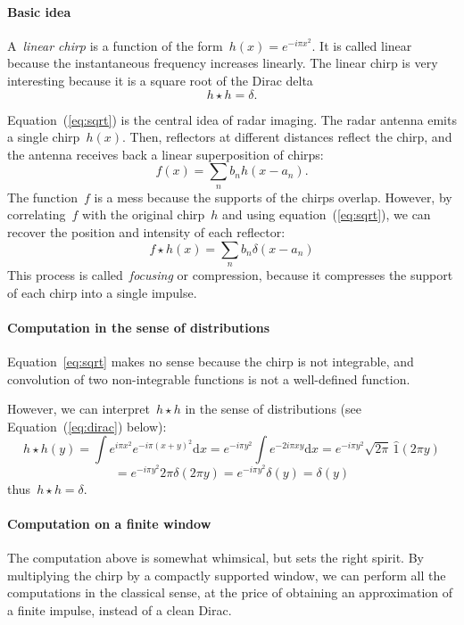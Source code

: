 \documentclass[a4paper]{article}      %
\newcommand{\1}{\mathbf{1}}
\newcommand{\ud}{\mathrm{d}}
\newcommand{\paren}[1]{\left(#1\right)}
\begin{document}
\paragraph{Basic idea}
A~\emph{linear chirp} is a function of the form~$h(x)=e^{-i\pi x^2}$.  It is
called linear because the instantaneous frequency increases linearly.
The linear chirp is very interesting because it is a square root of
the Dirac delta
\begin{equation}
	h\star h=\delta.
	\label{eq:sqrt}
\end{equation}

Equation~(\ref{eq:sqrt}) is the central idea of radar imaging.  The radar antenna
emits a single chirp~$h(x)$.  Then, reflectors at different distances reflect
the chirp, and the antenna receives back a linear superposition of chirps:
$$
f(x)=\sum_n b_n h(x-a_n).
$$
The function~$f$ is a mess because the supports of the chirps overlap.
However, by correlating~$f$ with the original chirp~$h$ and
using equation~(\ref{eq:sqrt}), we can recover the position and intensity of
each reflector:
$$
f\star h (x) = \sum_n b_n \delta(x - a_n)
$$
This process is called~\emph{focusing} or compression, because it
compresses the support of each chirp into a single impulse.

\paragraph{Computation in the sense of distributions}
Equation~\ref{eq:sqrt} makes no sense because the chirp is not integrable,
and convolution of two non-integrable functions is not a well-defined
function.

However, we can interpret~$h\star h$ in the sense of distributions (see
Equation~(\ref{eq:dirac}) below):
$$
h\star h (y)
=
\int e^{i\pi x^2}e^{-i\pi(x+y)^2}\ud x
=
e^{-i\pi y^2}
\int e^{-2i\pi xy}
\ud x
=
e^{-i\pi y^2}\sqrt{2\pi}\, \widehat{1}\paren{2\pi y}
$$
$$
=
e^{-i\pi y^2}2\pi\delta\paren{2\pi y}
=
e^{-i\pi y^2}\delta(y)
=\delta(y)
$$
thus~$h\star h=\delta$.


\paragraph{Computation on a finite window}
The computation above is somewhat whimsical, but sets the right spirit.  By
multiplying the chirp by a compactly supported window, we can perform all the
computations in the classical sense,  at the price of obtaining an
approximation of a finite impulse, instead of a clean Dirac.
\end{document}
